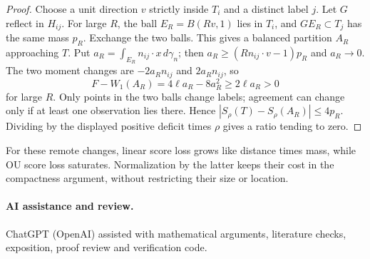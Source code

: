 \documentclass[11pt,reqno]{amsart}
\newcommand{\ga}{\gamma}
\begin{document}
\begin{proof}
Choose a unit direction $v$ strictly inside $T_i$ and a distinct label
$j$. Let $G$ reflect in $H_{ij}$. For large $R$, the ball
$E_R=B(Rv,1)$ lies in $T_i$, and $GE_R\subset T_j$ has the same
mass $p_R$. Exchange the two balls. This gives a balanced partition
$A_R$ approaching $T$. Put
$a_R=\int_{E_R}n_{ij}\cdot x\,d\ga_n$; then
$a_R\ge(Rn_{ij}\cdot v-1)p_R$ and $a_R\to0$.
The two moment changes are $-2a_Rn_{ij}$ and $2a_Rn_{ij}$, so
\[
 F-W_1(A_R)=4\ell a_R-8a_R^2\ge2\ell a_R>0
\]
for large $R$. Only points in the two balls change labels; agreement can
change only if at least one observation lies there. Hence
$|S_\rho(T)-S_\rho(A_R)|\le4p_R$. Dividing by the displayed
positive deficit times $\rho$ gives a ratio tending to zero.
\end{proof}

For these remote changes, linear score loss grows like distance times
mass, while OU score loss saturates. Normalization by the latter keeps
their cost in the compactness argument, without restricting their size
or location.

\paragraph{AI assistance and review.}
ChatGPT (OpenAI) assisted with mathematical arguments, literature checks,
exposition, proof review and verification code.
\end{document}
